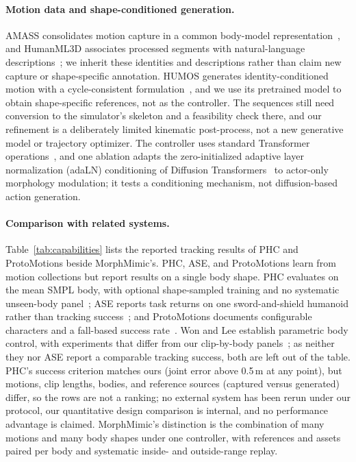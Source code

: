 \paragraph{Motion data and shape-conditioned generation.}
AMASS consolidates motion capture in a common body-model
representation~\cite{amass}, and HumanML3D associates processed segments with
natural-language descriptions~\cite{humanml3d}; we inherit these identities and
descriptions rather than claim new capture or shape-specific annotation. HUMOS
generates identity-conditioned motion with a cycle-consistent
formulation~\cite{humos}, and we use its pretrained model to obtain
shape-specific references, not as the controller. The sequences still need
conversion to the simulator's skeleton and a feasibility check there, and our
refinement is a deliberately limited kinematic post-process, not a new
generative model or trajectory optimizer. The controller uses standard
Transformer operations~\cite{attention}, and one ablation adapts the
zero-initialized adaptive layer normalization (adaLN) conditioning of
Diffusion Transformers~\cite{dit} to
actor-only morphology modulation; it tests a conditioning mechanism, not
diffusion-based action generation.

\paragraph{Comparison with related systems.}\label{sec:external_comparison}
Table~\ref{tab:capabilities} lists the reported tracking results of PHC and
ProtoMotions beside MorphMimic's. PHC, ASE, and ProtoMotions learn from motion
collections but report results on a single body shape. PHC evaluates on the mean
SMPL body, with optional shape-sampled training and no systematic unseen-body
panel~\cite{phc}; ASE reports task returns on one sword-and-shield humanoid
rather than tracking success~\cite{ase}; and ProtoMotions documents configurable
characters and a fall-based success rate~\cite{protomotions}. Won and Lee
establish parametric body control, with experiments that differ from our
clip-by-body panels~\cite{won2019}; as neither they nor ASE report a comparable
tracking success, both are left out of the table. PHC's success criterion matches ours (joint
error above 0.5\,m at any point), but motions, clip lengths, bodies, and reference sources (captured versus generated) differ,
so the rows are not a ranking; no external system has been rerun under our
protocol, our quantitative design comparison is internal, and no performance
advantage is claimed. MorphMimic's distinction is the combination of many
motions and many body shapes under one controller, with references and assets
paired per body and systematic inside- and outside-range replay.

